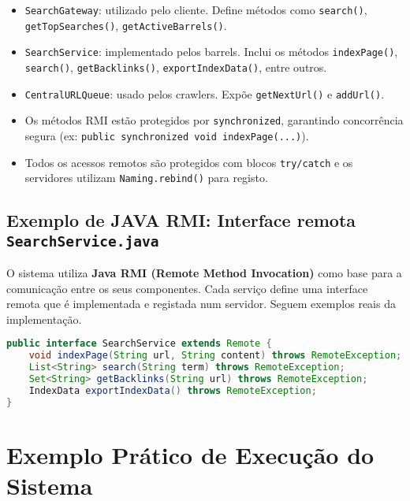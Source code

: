 \documentclass{article}
\begin{document}
\begin{itemize} \item \texttt{SearchGateway}: utilizado pelo cliente. Define métodos como \texttt{search()}, \texttt{getTopSearches()}, \texttt{getActiveBarrels()}.
\item \texttt{SearchService}: implementado pelos barrels. Inclui os métodos \texttt{indexPage()}, \texttt{search()}, \texttt{getBacklinks()}, \texttt{exportIndexData()}, entre outros.

\item \texttt{CentralURLQueue}: usado pelos crawlers. Expõe \texttt{getNextUrl()} e \texttt{addUrl()}.

\item Os métodos RMI estão protegidos por \texttt{synchronized}, garantindo concorrência segura (ex: \texttt{public synchronized void indexPage(...)}).

\item Todos os acessos remotos são protegidos com blocos \texttt{try/catch} e os servidores utilizam \texttt{Naming.rebind()} para registo.
\end{itemize}


\subsection*{Exemplo de JAVA RMI: Interface remota \texttt{SearchService.java}}

O sistema utiliza \textbf{Java RMI (Remote Method Invocation)} como base para a comunicação entre os seus componentes. Cada serviço define uma interface remota que é implementada e registada num servidor. Seguem exemplos reais da implementação.

\begin{lstlisting}[language=Java, caption={Interface remota SearchService}]
public interface SearchService extends Remote {
    void indexPage(String url, String content) throws RemoteException;
    List<String> search(String term) throws RemoteException;
    Set<String> getBacklinks(String url) throws RemoteException;
    IndexData exportIndexData() throws RemoteException;
}
\end{lstlisting}







\newpage
\section{Exemplo Prático de Execução do Sistema}
\end{document}
